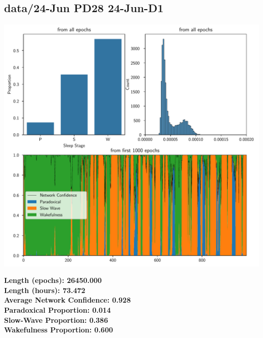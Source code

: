         \subsection*{ data/24-Jun PD28 24-Jun-D1 }
        \begin{center}
        \begin{adjustbox}{width=1\textwidth}
        \includegraphics[page=9]{figs.pdf}
        \end{adjustbox}
        \end{center}
        \large\textbf{Length (epochs): 26450.000}\\
        \textbf{Length (hours): 73.472}\\
        \textbf{Average Network Confidence: 0.928}\\
        \textbf{Paradoxical Proportion: 0.014}\\
        \textbf{Slow-Wave Proportion: 0.386}\\
        \textbf{Wakefulness Proportion: 0.600}\\
        
